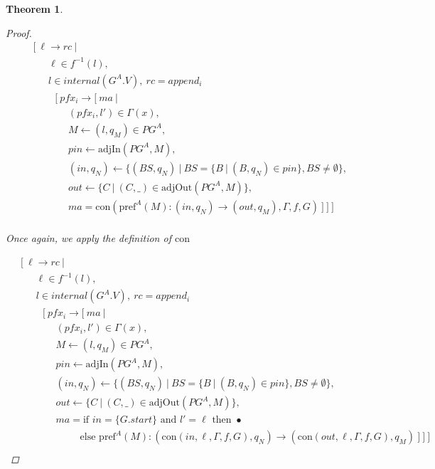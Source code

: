 \documentclass[twocolumn, openany]{sig-alternate-10pt}
\newcommand{\Con}{\mathrm{con}}
\newcommand{\Pref}{\ensuremath{\mathrm{pref}}}
\newtheorem{thm}{Theorem}
\begin{document}
\begin{thm}
\begin{proof}
  \[ \begin{array}{l}
     ~~~~~ [~ \ell \rightarrow rc ~\vert~ \\
     ~~~~~~~~~~~~ \ell \in f^{-1}(l), \\
     ~~~~~~~~~~~~ l \in internal(G^A.V), ~rc = append_i \\
     ~~~~~~~~~~~~~~~ [~ pfx_i \rightarrow [~ ma ~\vert~ \\
     ~~~~~~~~~~~~~~~~~~~~~ (pfx_i, l') \in \Gamma(x), \\
     ~~~~~~~~~~~~~~~~~~~~~ M \leftarrow (l,q_M) \in PG^A, \\
     ~~~~~~~~~~~~~~~~~~~~~ pin \leftarrow \text{adjIn}(PG^A,M), \\
     ~~~~~~~~~~~~~~~~~~~~~ (in,q_N) \leftarrow \{ (BS,q_N) ~\vert~ BS=\{B ~\vert~ (B,q_N) \in pin \}, BS \neq \emptyset \}, \\
     ~~~~~~~~~~~~~~~~~~~~~ out \leftarrow \{ C ~\vert~ (C,\_) \in \text{adjOut}(PG^A,M) \}, \\
     ~~~~~~~~~~~~~~~~~~~~~ ma = \Con(\Pref^A(M) : (in,q_N) \rightarrow (out,q_M), \Gamma, f, G) ~] ~] ~] \\
  \end{array} \]%

  \noindent
  Once again, we apply the definition of $\Con$

  \[ \begin{array}{l}
     ~~~~~ [~ \ell \rightarrow rc ~\vert~ \\
     ~~~~~~~~~~~~ \ell \in f^{-1}(l), \\
     ~~~~~~~~~~~~ l \in internal(G^A.V), ~rc = append_i \\
     ~~~~~~~~~~~~~~~ [~ pfx_i \rightarrow [~ ma ~\vert~ \\
     ~~~~~~~~~~~~~~~~~~~~~ (pfx_i, l') \in \Gamma(x), \\
     ~~~~~~~~~~~~~~~~~~~~~ M \leftarrow (l,q_M) \in PG^A, \\
     ~~~~~~~~~~~~~~~~~~~~~ pin \leftarrow \text{adjIn}(PG^A,M), \\
     ~~~~~~~~~~~~~~~~~~~~~ (in,q_N) \leftarrow \{ (BS,q_N) ~\vert~ BS=\{B ~\vert~ (B,q_N) \in pin \}, BS \neq \emptyset \}, \\
     ~~~~~~~~~~~~~~~~~~~~~ out \leftarrow \{ C ~\vert~ (C,\_) \in \text{adjOut}(PG^A,M) \}, \\
     ~~~~~~~~~~~~~~~~~~~~~ ma = \text{if } in = \{ G.start \} \text{ and } l'=\ell \text{ then } \bullet \\
     ~~~~~~~~~~~~~~~~~~~~~~~~~~~~~~~~ \text{else } \Pref^A(M) : (\Con(in, \ell, \Gamma, f, G),q_N) \rightarrow (\Con(out, \ell, \Gamma, f, G), q_M) ~] ~] ~]\\
  \end{array} \]%


\end{proof}
\end{thm}
\end{document}
